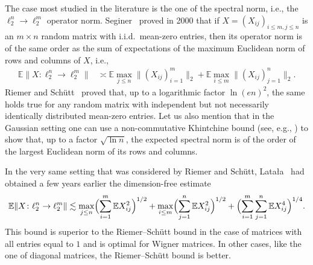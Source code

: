 \documentclass[a4paper]{amsart}
\theoremstyle{definition}
\theoremstyle{remark}
\numberwithin{equation}{section}
\newcommand*{\EE}{\mathbb{E}}
\begin{document}
The case most studied  in the literature is the one of the spectral norm, i.e., the $\ell_2^n \to \ell_2^m$ operator norm.
 Seginer~\cite{Seginer}
 proved in 2000 that if $X = (X_{ij})_{i\leq m, j\leq n}$ is an $m\times n$ random matrix
 with i.i.d.\ mean-zero entries,
 then its operator norm is of the same order as the sum of expectations
 of the maximum Euclidean norm of rows and columns of $X$, i.e.,
 \begin{align}
 	\label{eq:Seginer}
 	\EE \|X\colon \ell_{2}^n\to\ell_2^m\|
 	& \asymp
    \EE \max_{j \leq n} \|(X_{ij})_{i=1}^m\|_2
    + \EE \max_{i \leq m}\|(X_{ij})_{j=1}^n\|_{2}.
 \end{align}
Riemer and Sch\"utt~\cite{Riemer-Schuett} proved that,
up to a logarithmic factor $\ln(en)^2$, the same holds true for any random matrix with independent but not necessarily identically distributed mean-zero entries. Let us also mention that in the Gaussian setting one can use a non-commutative Khintchine bound (see, e.g., \cite[Equation (4.9)]{Tropp12}) to show that, up to a factor $\sqrt{\ln n}$, the expected spectral norm is of the order of the largest Euclidean norm of its rows and columns.

In the very same setting that was considered by Riemer and Sch\"utt, Lata{\l}a~\cite{Latala-Some-estimates} had obtained a few years earlier the dimension-free estimate
\begin{equation*}
\label{eq:Latala}
\EE  \|X \colon \ell_{2}^n\to\ell_2^m\|
\lesssim
 \max_{j\leq n} \Bigl(\sum_{i=1}^m \EE X_{ij}^2\Bigr)^{1/2}
 + \max_{i\leq m} \Bigl(\sum_{j=1}^n \EE X_{ij}^2\Bigr)^{1/2}
 +  \Bigl(\sum_{i=1}^m \sum_{j=1}^n \EE X_{ij}^4\Bigr)^{1/4}.
\end{equation*}
This bound is superior to the Riemer--Sch\"utt bound in the case of 
matrices with all entries equal to $1$ and is optimal for Wigner matrices. In other cases, like the one of diagonal matrices, the Riemer--Sch\"utt bound is better.
\end{document}
